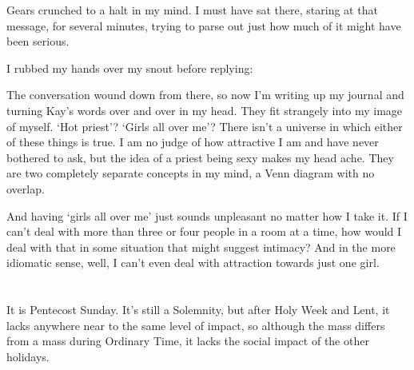 





Gears crunched to a halt in my mind. I must have sat there, staring at that message, for several minutes, trying to parse out just how much of it might have been serious.


I rubbed my hands over my snout before replying:



The conversation wound down from there, so now I'm writing up my journal and turning Kay's words over and over in my head. They fit strangely into my image of myself. `Hot priest'? `Girls all over me'? There isn't a universe in which either of these things is true. I am no judge of how attractive I am and have never bothered to ask, but the idea of a priest being sexy makes my head ache. They are two completely separate concepts in my mind, a Venn diagram with no overlap.

And having `girls all over me' just sounds unpleasant no matter how I take it. If I can't deal with more than three or four people in a room at a time, how would I deal with that in some situation that might suggest intimacy? And in the more idiomatic sense, well, I can't even deal with attraction towards just one girl.

\section{}

It is Pentecost Sunday. It's still a Solemnity, but after Holy Week and Lent, it lacks anywhere near to the same level of impact, so although the mass differs from a mass during Ordinary Time, it lacks the social impact of the other holidays.

